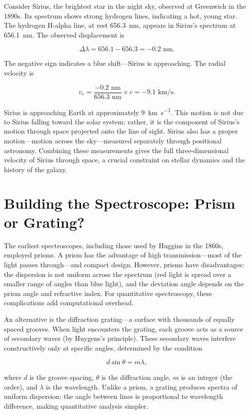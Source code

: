 Consider Sirius, the brightest star in the night sky, observed at Greenwich in the 1890s. Its spectrum shows strong hydrogen lines, indicating a hot, young star. The hydrogen H-alpha line, at rest \SI{656.3}{\nano\meter}, appears in Sirius's spectrum at \SI{656.1}{\nano\meter}. The observed displacement is

\[
  \Delta \lambda = 656.1 - 656.3 = -0.2 \text{ nm}.
\]

The negative sign indicates a blue shift—Sirius is approaching. The radial velocity is

\[
  v_r = \frac{-0.2 \text{ nm}}{656.3 \text{ nm}} \times c = -9.1 \text{ km/s}.
\]

Sirius is approaching Earth at approximately \SI{9}{\kilo\meter\per\second}. This motion is not due to Sirius falling toward the solar system; rather, it is the component of Sirius's motion through space projected onto the line of sight. Sirius also has a proper motion—motion across the sky—measured separately through positional astronomy. Combining these measurements gives the full three-dimensional velocity of Sirius through space, a crucial constraint on stellar dynamics and the history of the galaxy.

\section{Building the Spectroscope: Prism or Grating?}

The earliest spectroscopes, including those used by Huggins in the 1860s, employed prisms. A prism has the advantage of high transmission—most of the light passes through—and compact design. However, prisms have disadvantages: the dispersion is not uniform across the spectrum (red light is spread over a smaller range of angles than blue light), and the deviation angle depends on the prism angle and refractive index. For quantitative spectroscopy, these complications add computational overhead.

An alternative is the diffraction grating—a surface with thousands of equally spaced grooves. When light encounters the grating, each groove acts as a source of secondary waves (by Huygens's principle). These secondary waves interfere constructively only at specific angles, determined by the condition

\[
  d \sin \theta = m \lambda,
\]

where $d$ is the groove spacing, $\theta$ is the diffraction angle, $m$ is an integer (the order), and $\lambda$ is the wavelength. Unlike a prism, a grating produces spectra of uniform dispersion: the angle between lines is proportional to wavelength difference, making quantitative analysis simpler.


